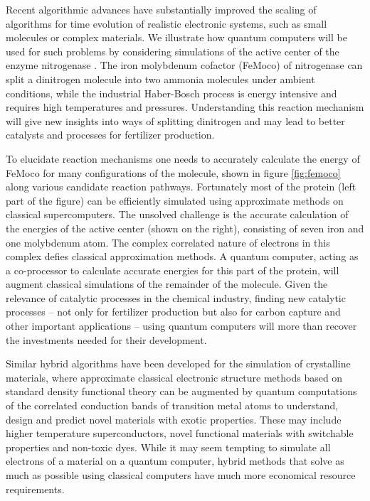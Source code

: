\documentclass[journal]{IEEEtran}
\begin{document}
Recent algorithmic advances have substantially improved the scaling of algorithms for time evolution of realistic electronic systems, such as small molecules or complex materials. We illustrate how quantum computers will be used for such problems by considering simulations of the active center of the enzyme nitrogenase \cite{nitrogenase}. The iron molybdenum cofactor (FeMoco) of nitrogenase can split a dinitrogen molecule into two ammonia molecules under ambient conditions, while the industrial Haber-Bosch process  is energy intensive and requires high temperatures and pressures. Understanding this reaction mechanism will give new insights into ways of splitting dinitrogen and may lead to better catalysts and processes for fertilizer production.



To elucidate reaction mechanisms one needs to accurately calculate the energy of FeMoco for many configurations of the molecule, shown in figure \ref{fig:femoco} along various candidate reaction pathways. Fortunately most of the protein (left part of the figure) can be efficiently simulated using approximate methods on classical supercomputers. The unsolved challenge is the accurate calculation of the energies of the active center (shown on the right), consisting of seven iron and one molybdenum atom. The complex correlated nature of electrons in this complex defies classical approximation methods. A quantum computer, acting as a co-processor to calculate accurate energies for this part of the protein, will augment classical simulations of the remainder of the molecule. Given the relevance of catalytic processes in the chemical industry, finding new catalytic processes -- not only for fertilizer production but also for carbon capture and other important applications -- using quantum computers will more than recover the investments needed for their development.

Similar hybrid algorithms have been developed for the simulation of crystalline materials, where approximate classical electronic structure methods based on standard density functional theory can be augmented by quantum computations of the correlated conduction bands of transition metal atoms to understand, design and predict novel materials with exotic properties. These may include higher temperature superconductors, novel functional materials with switchable properties and non-toxic dyes. While it may seem tempting to simulate all electrons of a material on a quantum computer, hybrid methods that solve as much as possible using classical computers have much more economical resource requirements.  
\end{document}
